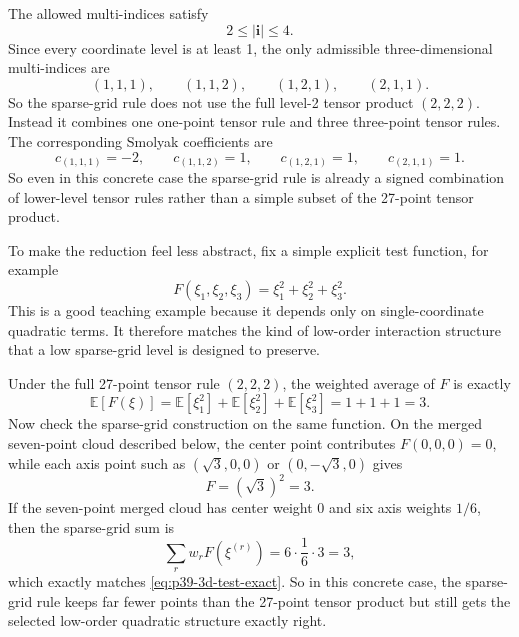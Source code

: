 \documentclass[11pt]{article}
\numberwithin{equation}{section}
\newcommand{\E}{\mathbb E}
\begin{document}
The allowed multi-indices satisfy
\begin{equation}
  2\le |\mathbf i| \le 4.
  \label{eq:p37-3d-band}
\end{equation}
Since every coordinate level is at least 1, the only admissible three-dimensional
multi-indices are
\begin{equation}
  (1,1,1),
  \qquad
  (1,1,2),
  \qquad
  (1,2,1),
  \qquad
  (2,1,1).
  \label{eq:p37-3d-active-indices}
\end{equation}
So the sparse-grid rule does not use the full level-2 tensor product
\((2,2,2)\).  Instead it combines one one-point tensor rule and three
three-point tensor rules.  The corresponding Smolyak coefficients are
\begin{equation}
  c_{(1,1,1)}=-2,
  \qquad
  c_{(1,1,2)}=1,
  \qquad
  c_{(1,2,1)}=1,
  \qquad
  c_{(2,1,1)}=1.
  \label{eq:p37-3d-coeffs}
\end{equation}
So even in this concrete case the sparse-grid rule is already a signed
combination of lower-level tensor rules rather than a simple subset of the
27-point tensor product.

To make the reduction feel less abstract, fix a simple explicit test function,
for example
\begin{equation}
  F(\xi_1,\xi_2,\xi_3)=\xi_1^2+\xi_2^2+\xi_3^2.
  \label{eq:p39-3d-test-function}
\end{equation}
This is a good teaching example because it depends only on single-coordinate
quadratic terms.  It therefore matches the kind of low-order interaction
structure that a low sparse-grid level is designed to preserve.

Under the full 27-point tensor rule \((2,2,2)\), the weighted average of
\(F\) is exactly
\begin{equation}
  \E[F(\xi)] = \E[\xi_1^2]+\E[\xi_2^2]+\E[\xi_3^2] = 1+1+1 = 3.
  \label{eq:p39-3d-test-exact}
\end{equation}
Now check the sparse-grid construction on the same function.  On the merged
seven-point cloud described below, the center point contributes
\(F(0,0,0)=0\), while each axis point such as \((\sqrt3,0,0)\) or
\((0,-\sqrt3,0)\) gives
\begin{equation}
  F = (\sqrt3)^2 = 3.
  \label{eq:p39-axis-value}
\end{equation}
If the seven-point merged cloud has center weight 0 and six axis weights
\(1/6\), then the sparse-grid sum is
\begin{equation}
  \sum_r w_rF(\xi^{(r)})
  = 6\cdot \frac16\cdot 3
  = 3,
  \label{eq:p39-3d-test-sparse-sum}
\end{equation}
which exactly matches \eqref{eq:p39-3d-test-exact}.  So in this concrete case,
the sparse-grid rule keeps far fewer points than the 27-point tensor product but
still gets the selected low-order quadratic structure exactly right.
\end{document}
